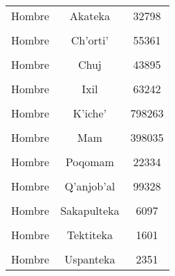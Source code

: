 \begin{table}
\begin{tabular}[t]{ccc}
Hombre & Akateka & 32798\\
\cellcolor[HTML]{B6B3FF}{Hombre} & \cellcolor[HTML]{B6B3FF}{Awakateka} & \cellcolor[HTML]{B6B3FF}{5745}\\
Hombre & Ch'orti' & 55361\\
\cellcolor[HTML]{B6B3FF}{Hombre} & \cellcolor[HTML]{B6B3FF}{Chalchiteka} & \cellcolor[HTML]{B6B3FF}{15906}\\
Hombre & Chuj & 43895\\
\cellcolor[HTML]{B6B3FF}{Hombre} & \cellcolor[HTML]{B6B3FF}{Itza'} & \cellcolor[HTML]{B6B3FF}{1531}\\
Hombre & Ixil & 63242\\
\cellcolor[HTML]{B6B3FF}{Hombre} & \cellcolor[HTML]{B6B3FF}{Jakalteko/Popti'} & \cellcolor[HTML]{B6B3FF}{25160}\\
Hombre & K'iche' & 798263\\
\cellcolor[HTML]{B6B3FF}{Hombre} & \cellcolor[HTML]{B6B3FF}{Kaqchiquel} & \cellcolor[HTML]{B6B3FF}{520222}\\
Hombre & Mam & 398035\\
\cellcolor[HTML]{B6B3FF}{Hombre} & \cellcolor[HTML]{B6B3FF}{Mopan} & \cellcolor[HTML]{B6B3FF}{1665}\\
Hombre & Poqomam & 22334\\
\cellcolor[HTML]{B6B3FF}{Hombre} & \cellcolor[HTML]{B6B3FF}{Poqomchi'} & \cellcolor[HTML]{B6B3FF}{87635}\\
Hombre & Q'anjob'al & 99328\\
\cellcolor[HTML]{B6B3FF}{Hombre} & \cellcolor[HTML]{B6B3FF}{Q'eqchi'} & \cellcolor[HTML]{B6B3FF}{684512}\\
Hombre & Sakapulteka & 6097\\
\cellcolor[HTML]{B6B3FF}{Hombre} & \cellcolor[HTML]{B6B3FF}{Sipakapense} & \cellcolor[HTML]{B6B3FF}{8513}\\
Hombre & Tektiteka & 1601\\
\cellcolor[HTML]{B6B3FF}{Hombre} & \cellcolor[HTML]{B6B3FF}{Tz'utujil} & \cellcolor[HTML]{B6B3FF}{52344}\\
Hombre & Uspanteka & 2351\\
\bottomrule
\end{tabular}
\end{table}
